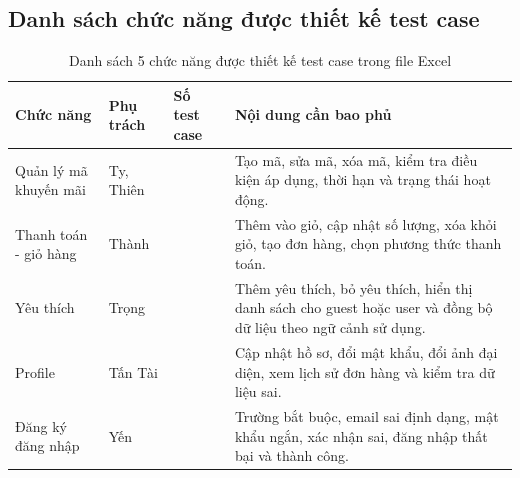\subsection{Danh sách chức năng được thiết kế test case}
\begin{table}[H]
	\centering
	\small
	\renewcommand{\arraystretch}{1.3}
	\begin{tabularx}{\textwidth}{|>{\raggedright\arraybackslash}p{3.1cm}|>{\centering\arraybackslash}p{2.2cm}|>{\centering\arraybackslash}p{1.7cm}|>{\raggedright\arraybackslash}X|}
		\hline
		\textbf{Chức năng} & \textbf{Phụ trách} & \textbf{Số test case} & \textbf{Nội dung cần bao phủ} \\
		\hline
		Quản lý mã khuyến mãi & Ty, Thiên & 15 & Tạo mã, sửa mã, xóa mã, kiểm tra điều kiện áp dụng, thời hạn và trạng thái hoạt động. \\
		\hline
		Thanh toán - giỏ hàng & Thành & 10 & Thêm vào giỏ, cập nhật số lượng, xóa khỏi giỏ, tạo đơn hàng, chọn phương thức thanh toán. \\
		\hline
		Yêu thích & Trọng & 10 & Thêm yêu thích, bỏ yêu thích, hiển thị danh sách cho guest hoặc user và đồng bộ dữ liệu theo ngữ cảnh sử dụng. \\
		\hline
		Profile & Tấn Tài & 10 & Cập nhật hồ sơ, đổi mật khẩu, đổi ảnh đại diện, xem lịch sử đơn hàng và kiểm tra dữ liệu sai. \\
		\hline
		Đăng ký đăng nhập & Yến & 10 & Trường bắt buộc, email sai định dạng, mật khẩu ngắn, xác nhận sai, đăng nhập thất bại và thành công. \\
		\hline
	\end{tabularx}
	\caption{Danh sách 5 chức năng được thiết kế test case trong file Excel}
	\label{tab:testcase-design-list}
\end{table}
